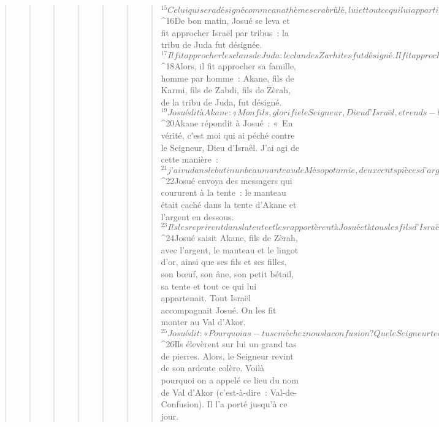 \begin{verse}
\begin{verse}
\begin{verse}
\begin{verse}
\begin{verse}
\begin{verse}
\begin{verse}
${}^{15}Celui qui sera désigné comme anathème sera brûlé, lui et tout ce qui lui appartient, puisqu’il a transgressé l’alliance du Seigneur et commis en Israël un acte insensé. »
${}^{16}De bon matin, Josué se leva et fit approcher Israël par tribus : la tribu de Juda fut désignée. 
${}^{17}Il fit approcher les clans de Juda : le clan des Zarhites fut désigné. Il fit approcher le clan des Zarhites, homme par homme : Zabdi fut désigné. 
${}^{18}Alors, il fit approcher sa famille, homme par homme : Akane, fils de Karmi, fils de Zabdi, fils de Zèrah, de la tribu de Juda, fut désigné. 
${}^{19}Josué dit à Akane : « Mon fils, glorifie le Seigneur, Dieu d’Israël, et rends-lui grâce ; révèle-moi ce que tu as fait, ne me cache rien. » 
${}^{20}Akane répondit à Josué : « En vérité, c’est moi qui ai péché contre le Seigneur, Dieu d’Israël. J’ai agi de cette manière : 
${}^{21}j’ai vu dans le butin un beau manteau de Mésopotamie, deux cents pièces d’argent et un lingot d’or d’une valeur de cinquante pièces. J’en ai eu envie ; je les ai pris ; ils sont cachés dans la terre au milieu de ma tente, et l’argent est dessous. » 
${}^{22}Josué envoya des messagers qui coururent à la tente : le manteau était caché dans la tente d’Akane et l’argent en dessous. 
${}^{23}Ils les reprirent dans la tente et les rapportèrent à Josué et à tous les fils d’Israël. On les déposa devant le Seigneur.
${}^{24}Josué saisit Akane, fils de Zèrah, avec l’argent, le manteau et le lingot d’or, ainsi que ses fils et ses filles, son bœuf, son âne, son petit bétail, sa tente et tout ce qui lui appartenait. Tout Israël accompagnait Josué. On les fit monter au Val d’Akor. 
${}^{25}Josué dit : « Pourquoi as-tu semé chez nous la confusion ? Que le Seigneur te confonde aujourd’hui ! » Tout Israël le lapida, on les brûla, on leur jeta des pierres. 
${}^{26}Ils élevèrent sur lui un grand tas de pierres. Alors, le Seigneur revint de son ardente colère. Voilà pourquoi on a appelé ce lieu du nom de Val d’Akor (c’est-à-dire : Val-de-Confusion). Il l’a porté jusqu’à ce jour.
      

\end{verse}
\end{verse}
\end{verse}
\end{verse}
\end{verse}
\end{verse}
\end{verse}
